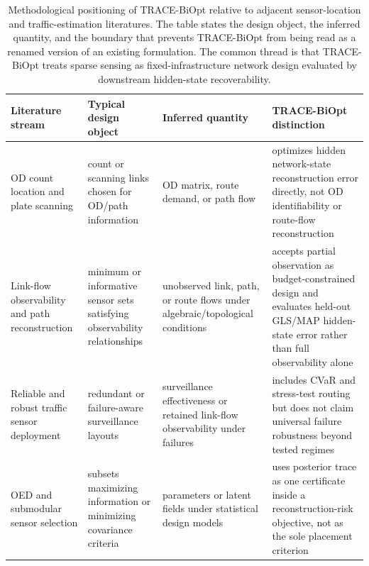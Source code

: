 \begin{table}[pos=htbp]
\centering
\caption{Methodological positioning of TRACE-BiOpt relative to adjacent sensor-location and traffic-estimation literatures. The table states the design object, the inferred quantity, and the boundary that prevents TRACE-BiOpt from being read as a renamed version of an existing formulation. The common thread is that TRACE-BiOpt treats sparse sensing as fixed-infrastructure network design evaluated by downstream hidden-state recoverability.}
\label{tab:method-positioning}
\small
\begin{tabular}{>{\raggedright\arraybackslash}p{}>{\raggedright\arraybackslash}p{}>{\raggedright\arraybackslash}p{}>{\raggedright\arraybackslash}p{}}
\toprule
Literature stream & Typical design object & Inferred quantity & TRACE-BiOpt distinction \\
\midrule
OD count location and plate scanning \citep{yang1998optimal,ehlert2006optimisation,castillo2008trip,minguez2010plate,simonelli2012od} & count or scanning links chosen for OD/path information & OD matrix, route demand, or path flow & optimizes hidden network-state reconstruction error directly, not OD identifiability or route-flow reconstruction \\
Link-flow observability and path reconstruction \citep{hu2009identification,he2013graphical,ng2012synergistic,viti2014partial,rinaldi2017route,zhuo2024revisiting} & minimum or informative sensor sets satisfying observability relationships & unobserved link, path, or route flows under algebraic/topological conditions & accepts partial observation as budget-constrained design and evaluates held-out GLS/MAP hidden-state error rather than full observability alone \\
Reliable and robust traffic sensor deployment \citep{li2011reliable,li2012opre,xu2016robust,salari2019failure,yu2023robustness} & redundant or failure-aware surveillance layouts & surveillance effectiveness or retained link-flow observability under failures & includes CVaR and stress-test routing but does not claim universal failure robustness beyond tested regimes \\
OED and submodular sensor selection \citep{joshi2009sensor,krause2008near,krause2008robust} & subsets maximizing information or minimizing covariance criteria & parameters or latent fields under statistical design models & uses posterior trace as one certificate inside a reconstruction-risk objective, not as the sole placement criterion \\

\end{tabular}
\end{table}
